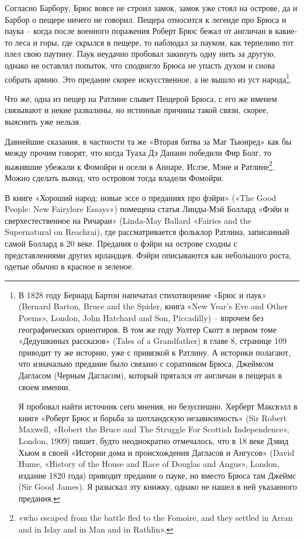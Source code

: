 Согласно Барбору, Брюс вовсе не строил замок, замок уже стоял на острове, да и Барбор о пещере ничего не говорил. Пещера относится к легенде про Брюса и паука – когда после военного поражения Роберт Брюс бежал от англичан в какие-то леса и горы, где скрылся в пещере, то наблюдал за пауком, как терпеливо тот плел свою паутину. Паук неудачно пробовал закинуть одну нить за другую, однако не оставлял попыток, что сподвигло Брюса не упасть духом и снова собрать армию. Это предание скорее искусственное, а не вышло из уст народа\footnote{В 1828 году Бернард Бартон напечатал стихотворение «Брюс и паук» (Bernard Barton, Bruce and the Spider, книга «New Year's Eve and Other Poems», London, John Hatchard and Son, Piccadilly) – впрочем без географических ориентиров. В том же году Уолтер Скотт в первом томе «Дедушкиных рассказов» (Tales of a Grandfather) в главе 8, странице 109 приводит ту же историю, уже с привязкой к Ратлину. А историки полагают, что изначально предание было связано с соратником Брюса, Джеймсом Дагласом (Черным Дагласом), который прятался от англичан в пещерах в своем имении. 

Я пробовал найти источник сего мнения, но безуспешно. Херберт Максвэлл в книге «Роберт Брюс и борьба за шотландскую независимость» (Sir Robert Maxwell, «Robert the Bruce and The Struggle For Scottish Independence», London, 1909) пишет, будто неоднократно отмечалось, что в 18 веке Дэвид Хьюм в своей «Истории дома и происхождения Дагласов и Ангусов» (David Hume, «History of the House and Race of Douglas and Angus», London, издание 1820 года) приводит предание о пауке, но вместо Брюса там Джеймс (Sir Good James). Я разыскал эту книжку, однако не нашел в ней указанного предания.}.  
 
Что же, одна из пещер на Ратлине слывет Пещерой Брюса, с его же именем связывают и некие развалины, но истинные причины такой связи, скорее, выяснить уже нельзя.

Давнейшие сказания, в частности та же «Вторая битва за Маг Тьюиред» как бы между прочим говорят, что когда Туаха Дэ Дананн победили Фир Болг, то выжившие убежали к Фомойри и осели в Аннаре, Ислэе, Мэне и Ратлине\footnote{«who escaped from the battle fled to the Fomoire, and they settled in Arran and in Islay and in Man and in Rathlin».}. Можно сделать вывод, что островом тогда владели Фомойри.

В книге «Хороший народ: новые эссе о преданиях про фэйри» («The Good People: New Fairylore Essays») помещена статья Линды-Мэй Боллард «Фэйи и сверхестественное на Ричараи» (Linda-May Ballard «Fairies and the Supernatural on Reachrai), где рассматривается фольклор Ратлина, записанный самой Боллард в 20 веке. Предания о фэйри на острове сходны с представлениями других ирландцев. Фэйри описываются как небольшого роста, одетые обычно в красное и зеленое.

